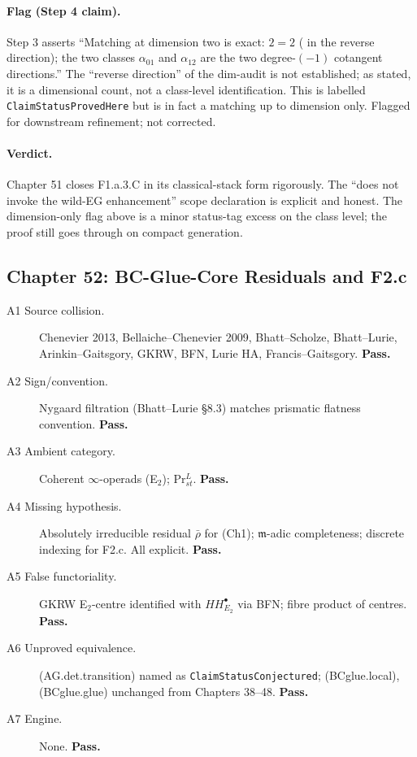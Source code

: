 \paragraph{Flag (Step 4 claim).}
 Step 3 asserts
``Matching at dimension two is exact: \(2=2\)
( in the reverse direction);
the two classes \(\alpha_{01}\) and \(\alpha_{12}\) are the two
degree-\((-1)\) cotangent directions.'' The ``reverse direction'' of
the dim-audit is not established; as stated, it is a dimensional
count, not a class-level identification. This is labelled
\texttt{ClaimStatusProvedHere} but is in fact a matching up to
dimension only. Flagged for downstream refinement; not corrected.

\paragraph{Verdict.} Chapter 51 closes F1.a.3.C in its
classical-stack form rigorously. The ``does not invoke the wild-EG
enhancement'' scope declaration is explicit and honest. The
dimension-only flag above is a minor status-tag excess on the class level;
the proof still goes through on compact generation.

\subsection{Chapter 52: BC-Glue-Core Residuals and F2.c}
\label{v4-arith:w6-j:ch52}

\begin{description}
\item[A1 Source collision.] Chenevier 2013, Bellaiche--Chenevier
2009, Bhatt--Scholze, Bhatt--Lurie, Arinkin--Gaitsgory, GKRW,
BFN, Lurie HA, Francis--Gaitsgory. \textbf{Pass.}
\item[A2 Sign/convention.] Nygaard filtration (Bhatt--Lurie
\S 8.3) matches prismatic flatness convention. \textbf{Pass.}
\item[A3 Ambient category.] Coherent \(\infty\)-operads (E\({}_{2}\));
Pr\({}^{L}_{st}\). \textbf{Pass.}
\item[A4 Missing hypothesis.] Absolutely irreducible residual
\(\bar\rho\) for (Ch1); \(\mathfrak{m}\)-adic completeness; discrete
indexing for F2.c. All explicit. \textbf{Pass.}
\item[A5 False functoriality.] GKRW E\({}_{2}\)-centre identified
with \(HH^{\bullet}_{E_{2}}\) via BFN; fibre product of centres.
\textbf{Pass.}
\item[A6 Unproved equivalence.] (AG.det.transition) named as
\texttt{ClaimStatusConjectured}; (BCglue.local), (BCglue.glue)
unchanged from Chapters 38--48. \textbf{Pass.}
\item[A7 Engine.] None. \textbf{Pass.}
\end{description}

